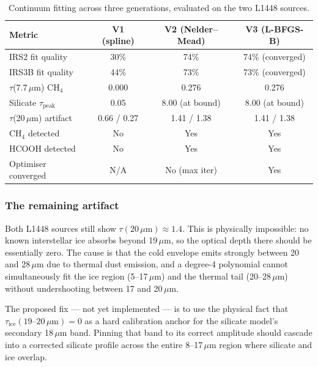 \documentclass[11pt,a4paper]{article}
\newcommand{\um}{\,$\mu$m}
\begin{document}
\begin{table}[H]
\centering
\small
\begin{tabular}{@{}lccc@{}}
\toprule
\textbf{Metric} & \textbf{V1 (spline)} & \textbf{V2 (Nelder--Mead)} &
\textbf{V3 (L-BFGS-B)} \\
\midrule
IRS2 fit quality        & 30\%  & 74\%          & 74\% (converged) \\
IRS3B fit quality       & 44\%  & 73\%          & 73\% (converged) \\
$\tau$(7.7\um) CH$_4$   & 0.000 & 0.276         & 0.276 \\
Silicate $\tau_{\text{peak}}$ & 0.05 & 8.00 (at bound) & 8.00 (at bound) \\
$\tau$(20\um) artifact  & 0.66 / 0.27 & 1.41 / 1.38 & 1.41 / 1.38 \\
CH$_4$ detected         & No    & Yes           & Yes \\
HCOOH detected          & No    & Yes           & Yes \\
Optimiser converged     & N/A   & No (max iter) & Yes \\
\bottomrule
\end{tabular}
\caption{Continuum fitting across three generations, evaluated on the two
L1448 sources.}
\end{table}

\subsubsection*{The remaining artifact}

Both L1448 sources still show $\tau(20\,\mu\text{m}) \approx 1.4$. This is
physically impossible: no known interstellar ice absorbs beyond 19\um, so
the optical depth there should be essentially zero. The cause is that the
cold envelope emits strongly between 20 and 28\um{} due to thermal dust
emission, and a degree-4 polynomial cannot simultaneously fit the ice
region (5--17\um) and the thermal tail (20--28\um) without undershooting
between 17 and 20\um.

The proposed fix --- not yet implemented --- is to use the physical fact
that $\tau_{\text{ice}}(19\text{--}20\,\mu\text{m}) = 0$ as a hard
calibration anchor for the silicate model's secondary 18\um{} band. Pinning
that band to its correct amplitude should cascade into a corrected silicate
profile across the entire 8--17\um{} region where silicate and ice overlap.

\end{document}
